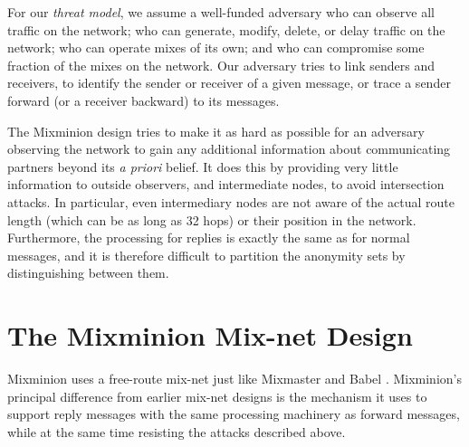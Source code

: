 \documentclass[final,inpress,inline]{ieee}
\begin{document}
For our \emph{threat model}, we assume a well-funded adversary who can 
observe all traffic on the
network; who can generate, modify, delete, or delay traffic on the
network; who can operate mixes of its own; and who can compromise some
fraction of the mixes on the network. Our adversary tries to
link senders and receivers, to identify the sender or
receiver of a given message, or trace a sender forward (or a receiver
backward) to its messages.

The Mixminion design tries to make it as hard as possible for an
adversary observing the network to gain any additional information
about communicating partners beyond its \emph{a priori} belief. It does
this by providing very little information to outside observers, and
intermediate nodes, to avoid intersection attacks. In particular, even
intermediary nodes are not aware of the actual route length (which can
be as long as 32 hops) or their position in the network. Furthermore,
the processing for replies is exactly the same as for normal messages,
and it is therefore difficult to partition the anonymity sets by
distinguishing between them. 



\section{The Mixminion Mix-net Design}

\label{sec:design}

Mixminion uses a free-route mix-net just like Mixmaster \cite{mixmaster-spec}
and Babel \cite{babel}.
Mixminion's principal difference from earlier mix-net
designs is the mechanism it uses to support reply messages with the
same processing machinery as forward messages, while at the same time
resisting the attacks described above.
\end{document}
